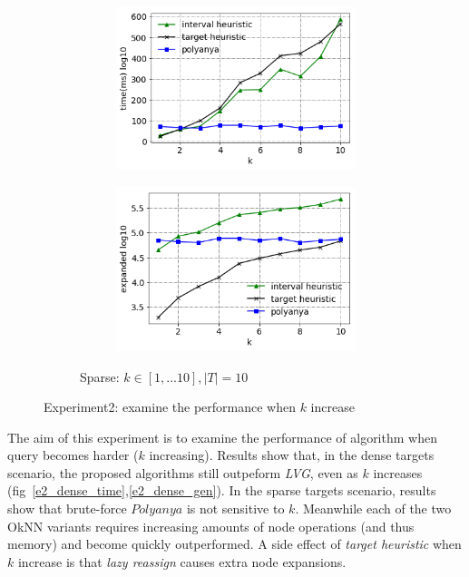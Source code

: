 \begin{figure}[!htb]
\begin{subfigure}{\linewidth}
\begin{subfigure}{0.5\textwidth}
        \includegraphics[width=.9\textwidth]{pic/e2_sparse_time.png}
        \caption{}
        \label{e2_sparse_time}
    \end{subfigure}%
    \hfill
    \begin{subfigure}{0.5\textwidth}
        \centering
        \includegraphics[width=.9\textwidth]{pic/e2_sparse_gen.png}
        \caption{}
        \label{e2_sparse_gen}
    \end{subfigure}
    \caption*{Sparse: $k \in [1,...10], |T|=10$}
  \end{subfigure}
  \caption{\small Experiment2: examine the performance when $k$ increase}
\end{figure}
%
The aim of this experiment is to examine the performance of algorithm when query becomes harder ($k$ increasing).
Results show that, in the dense targets scenario, the proposed algorithms still outpeform \textit{LVG}, even as $k$ increases (fig~\ref{e2_dense_time},\ref{e2_dense_gen}).
In the sparse targets scenario, results show that brute-force $Polyanya$ is not sensitive to $k$.
Meanwhile each of the two OkNN variants requires increasing amounts of node operations (and thus memory) and become quickly outperformed.
A side effect of \textit{target heuristic} when $k$ increase is that \textit{lazy reassign} causes extra node expansions.

